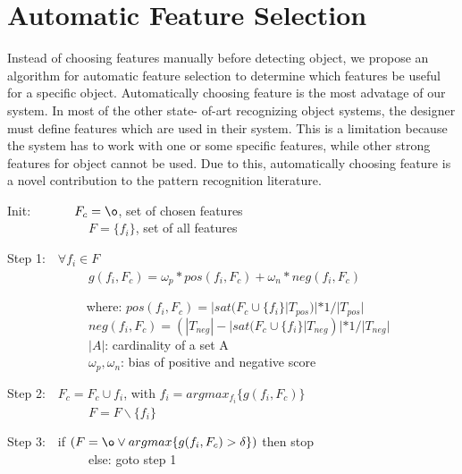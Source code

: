 \section{Automatic Feature Selection}
\label{sec:feature_selection}
Instead of choosing features manually before detecting object, we propose an algorithm for automatic feature selection to determine which features be useful for a specific object. Automatically choosing
feature is the most advatage of our system. In most of the other state-
of-art recognizing object systems, the designer must define features
which are used in their system. This is a limitation
because the system has to work with one or some specific features,
while other strong features for object cannot be used. Due to this,
automatically choosing feature is a novel contribution to the pattern recognition literature. 

Init:\mbox{~~~~~~~}$F_c = \o$, set of chosen features\\
\mbox{~~~~~~~~}\mbox{~~~~~}$F = \{f_i\}$, set of all features

Step 1:\mbox{~~}$\forall f_i \in F$\\
\mbox{~~~~~~~~~~~~~}$g(f_i,F_c) = \omega_p * pos(f_i,F_c) + \omega_n * neg(f_i,F_c)$

\mbox{~~~~~~~~~~~~} where: $ pos(f_i,F_c) = |sat(F_c \cup \{f_i\}|T_{pos})| * 1/|T_{pos}|$\\
\mbox{~~~~~~~~~~~~~}$neg(f_i,F_c) = (|T_{neg}| - |sat(F_c \cup \{f_i\}|T_{neg})| * 1/|T_{neg}|$\\
\mbox{~~~~~~~~~~~~~}$|A|$: cardinality of a set A\\
\mbox{~~~~~~~~~~~~~}$\omega_p, \omega_n$: bias of positive and negative score

Step 2:\mbox{~~}$F_c = F_c \cup {f_i}$, with $f_i = argmax_{f_i}\{g(f_i, F_c)\}$\\
\mbox{~~~~~~~~~~~~~}$F = F \backslash \{f_i\}$

Step 3:\mbox{~~}if $(F = \o \vee argmax\{g(f_i,F_c) > \delta\})$ then stop\\
\mbox{~~~~~~~~~~~~~}else: goto step 1


